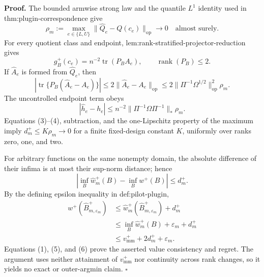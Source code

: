 \textbf{Proof.}
The bounded armwise strong law and the quantile \(L^1\) identity used in thm:plugin-correspondence give
\[
\rho_m:=\max_{e\in\{L,U\}}\lVert\widehat Q_e-Q(c_e)\rVert_{\mathrm{op}}
\longrightarrow0
\quad\text{almost surely}.
\tag{1}
\]
For every quotient class and endpoint, lem:rank-stratified-projector-reduction gives
\[
g_B^+(c_e)=n^{-2}\operatorname{tr}(P_BA_e),
\qquad \operatorname{rank}(P_B)\le2.
\tag{2}
\]
If \(\widehat A_e\) is formed from \(\widehat Q_e\), then
\[
|\operatorname{tr}\{P_B(\widehat A_e-A_e)\}|
\le2\lVert\widehat A_e-A_e\rVert_{\mathrm{op}}
\le2\lVert\Pi^{-1}\Omega^{1/2}\rVert_{\mathrm{op}}^2\rho_m.
\tag{3}
\]
The uncontrolled endpoint term obeys
\[
|\widehat h_e-h_e|
\le n^{-2}\lVert\Pi^{-1}\Omega\Pi^{-1}\rVert_*\rho_m.
\tag{4}
\]
Equations (3)--(4), subtraction, and the one-Lipschitz property of the maximum imply \(d_m^+\le K\rho_m\to0\) for a finite fixed-design constant \(K\), uniformly over ranks zero, one, and two.

For arbitrary functions on the same nonempty domain, the absolute difference of their infima is at most their sup-norm distance; hence
\[
\left|\inf_B\widehat w_m^+(B)-\inf_Bw^+(B)\right|\le d_m^+.
\tag{5}
\]
By the defining epsilon inequality in def:pilot-plugin,
\[
\begin{aligned}
w^+(\widehat B_{m,\varepsilon_m}^+)
&\le\widehat w_m^+(\widehat B_{m,\varepsilon_m}^+)+d_m^+\\
&\le\inf_B\widehat w_m^+(B)+\varepsilon_m+d_m^+\\
&\le v_{\mathrm{mm}}^++2d_m^++\varepsilon_m.
\end{aligned}
\tag{6}
\]
Equations (1), (5), and (6) prove the asserted value consistency and regret.  The argument uses neither attainment of \(v_{\mathrm{mm}}^+\) nor continuity across rank changes, so it yields no exact or outer-argmin claim. \(\square\)